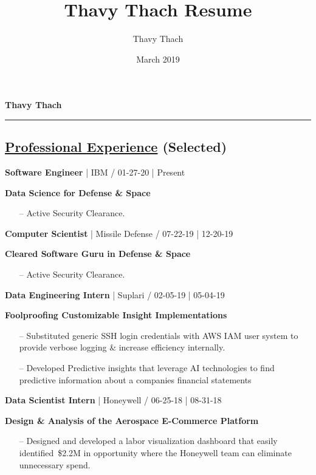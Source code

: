 \documentclass{article}
\title{Thavy Thach Resume}
\author{Thavy Thach}
\date{March 2019}
\begin{document}
\textbf{{\huge Thavy Thach}}
\newline
\noindent\rule{19cm}{0.1pt}

\begin{multicols}{2}

\section*{\underline{Professional Experience} {\small(Selected)}}

{\footnotesize{\textbf{Software Engineer} | IBM / 01-27-20 | Present}}
{\footnotesize{
\newline\textbf{Data Science for Defense \& Space}
\begin{itemize}
	\item[--] Active Security Clearance.
\end{itemize}
}}
\hfill \break
{\footnotesize{\textbf{Computer Scientist} | Missile Defense / 07-22-19 | 12-20-19}}
{\footnotesize{
\newline\textbf{Cleared Software Guru in Defense \& Space}
\begin{itemize}
	\item[--] Active Security Clearance.
\end{itemize}
}}
\hfill \break
{\footnotesize{\textbf{Data Engineering Intern} | Suplari / 02-05-19 | 05-04-19}}
{\footnotesize{
\newline\textbf{Foolproofing Customizable Insight Implementations}
\begin{itemize}
	\item[--] Substituted generic SSH login credentials with AWS IAM user system to provide verbose logging \& increase efficiency internally.
	\item[--] Developed Predictive insights that leverage AI technologies to find predictive information about a companies financial statements
\end{itemize} 
}}
\hfill \break
{\footnotesize{\textbf{Data Scientist Intern} | Honeywell / 06-25-18 | 08-31-18}}
{\footnotesize{
\newline\textbf{Design \& Analysis of the Aerospace E-Commerce Platform}
\begin{itemize}
	\item[--] Designed and developed a labor visualization dashboard that easily identified~\$2.2M  in opportunity where the Honeywell team can eliminate unnecessary spend. 

\end{itemize}}}
\end{multicols}
\end{document}
